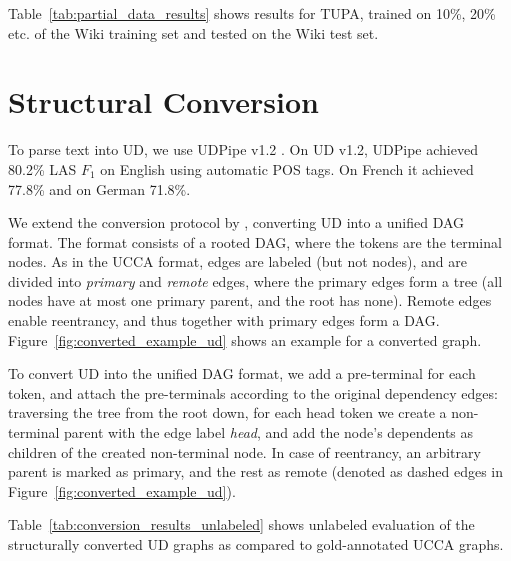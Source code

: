 \documentclass[11pt,a4paper]{article}
\begin{document}
Table~\ref{tab:partial_data_results} shows results for TUPA,
trained on 10\%, 20\% etc. of the Wiki training set and tested on the Wiki test set.


\section{Structural Conversion}\label{sec:conversion}

To parse text into UD, we use UDPipe v1.2 \cite{udpipe:2017}.
On UD v1.2, UDPipe achieved 80.2\% LAS $F_1$ on English using automatic POS tags.
On French it achieved 77.8\% and on German 71.8\%.

We extend the conversion protocol by ,
converting UD into a unified DAG format.
The format consists of a rooted DAG, where the tokens are the terminal nodes.
As in the UCCA format, edges are labeled (but not nodes),
and are divided into \textit{primary} and \textit{remote} edges,
where the primary edges form a tree (all nodes have at most one primary parent,
and the root has none).
Remote edges enable reentrancy, and thus together with primary edges
form a DAG.
Figure~\ref{fig:converted_example_ud} shows an example for a converted graph.

To convert UD into the unified DAG format,
we add a pre-terminal for each token,
and attach the pre-terminals according to the original dependency edges:
traversing the tree from the root down, for each head token we create a non-terminal
parent with the edge label {\it head},
and add the node's dependents as children of the created non-terminal node.
In case of reentrancy, an arbitrary parent is marked as primary, and the rest as remote
(denoted as dashed edges in Figure~\ref{fig:converted_example_ud}).

Table~\ref{tab:conversion_results_unlabeled} shows unlabeled evaluation of the
structurally converted UD graphs as compared to gold-annotated UCCA graphs.
\end{document}
